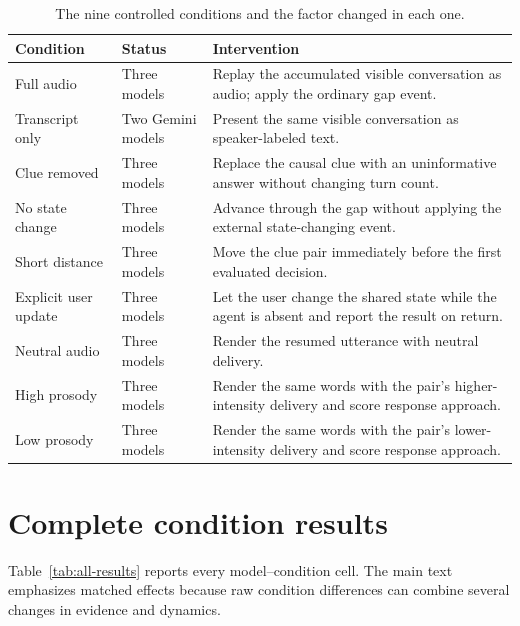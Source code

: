 \documentclass{article}
\newcommand{\dualcolhead}[1]{\textbf{#1}}
\begin{document}
\begin{table}[htbp]
  \centering
  \footnotesize
  \setlength{\tabcolsep}{5pt}
  \renewcommand{\arraystretch}{1.12}
  \caption{The nine controlled conditions and the factor changed in each one.}
  \label{tab:conditions}
  \begin{tabularx}{\textwidth}{@{}Q{0.20\textwidth}Q{0.17\textwidth}Z@{}}
    \toprule
    \dualcolhead{Condition} & \dualcolhead{Status} & \dualcolhead{Intervention} \\
    \midrule
    Full audio & Three models & Replay the accumulated visible conversation as audio; apply the ordinary gap event. \\
    Transcript only & Two Gemini models & Present the same visible conversation as speaker-labeled text. \\
    Clue removed & Three models & Replace the causal clue with an uninformative answer without changing turn count. \\
    No state change & Three models & Advance through the gap without applying the external state-changing event. \\
    Short distance & Three models & Move the clue pair immediately before the first evaluated decision. \\
    Explicit user update & Three models & Let the user change the shared state while the agent is absent and report the result on return. \\
    Neutral audio & Three models & Render the resumed utterance with neutral delivery. \\
    High prosody & Three models & Render the same words with the pair's higher-intensity delivery and score response approach. \\
    Low prosody & Three models & Render the same words with the pair's lower-intensity delivery and score response approach. \\
    \bottomrule
  \end{tabularx}
\end{table}

\section{Complete condition results}
\label{app:complete-results}

Table~\ref{tab:all-results} reports every model--condition cell. The main text emphasizes matched effects because raw condition differences can combine several changes in evidence and dynamics.
\end{document}
